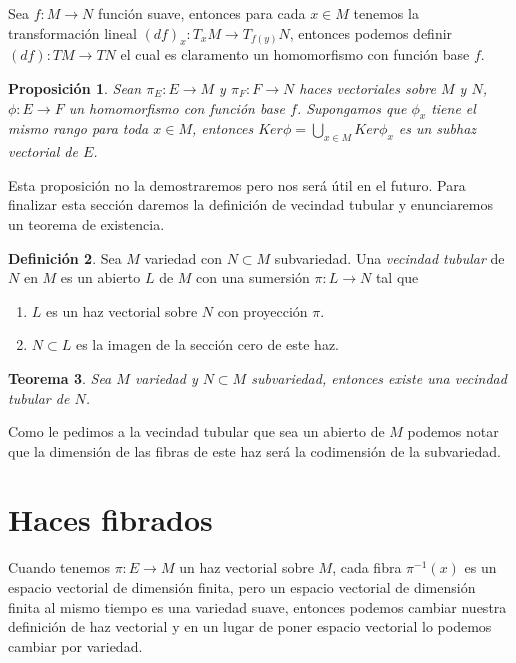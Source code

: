 \documentclass{report}
\newtheorem{theorem}{Teorema}[section]
\newtheorem{prop}[theorem]{Proposici\'on}
\theoremstyle{definition}
\newtheorem{defi}[theorem]{Definici\'on}
\begin{document}
Sea $f: M \to N$ funci\'on suave, entonces para cada $x \in M$ tenemos la transformaci\'on lineal $(df)_x : T_x M \to T_{f(y)}N$, entonces podemos definir $(df): TM \to TN$ el cual es claramento un homomorfismo con funci\'on base $f$.

\begin{prop}
Sean $\pi_E: E \to M$ y $\pi_F: F \to N$ haces vectoriales sobre $M$ y $N$, $\phi: E \to F$ un homomorfismo con funci\'on base $f$. Supongamos que $\phi_x$ tiene el mismo rango para toda $x \in M$, entonces $Ker \phi = \bigcup\limits_{x \in M} Ker \phi_x$ es un subhaz vectorial de $E$.
\end{prop}

Esta proposici\'on no la demostraremos pero nos ser\'a \'util en el futuro. Para finalizar esta secci\'on daremos la definici\'on  de vecindad tubular y enunciaremos un teorema de existencia.

\begin{defi}
Sea $M$ variedad con $N \subset M$ subvariedad. Una \textit{vecindad tubular} de $N$ en $M$ es un abierto $L$ de $M$ con una sumersi\'on $\pi: L \to N$ tal que
\begin{enumerate}
\item $L$ es un haz vectorial sobre $N$ con proyecci\'on $\pi$.
\item $N \subset L$ es la imagen de la secci\'on cero de este haz.
\end{enumerate}
\end{defi}

\begin{theorem}
Sea $M$ variedad y $N \subset M$ subvariedad, entonces existe una vecindad tubular de $N$.
\end{theorem}

Como le pedimos a la vecindad tubular que sea un abierto de $M$ podemos notar que la dimensi\'on de las fibras de este haz ser\'a la codimensi\'on de la subvariedad.

\section{Haces fibrados}

Cuando tenemos $\pi: E \to M$ un haz vectorial sobre $M$, cada fibra $\pi^{-1} (x)$ es un espacio vectorial de dimensi\'on finita, pero un espacio vectorial de dimensi\'on finita al mismo tiempo es una variedad suave, entonces podemos cambiar nuestra definici\'on de haz vectorial y en un lugar de poner espacio vectorial lo podemos cambiar por variedad.
\end{document}
